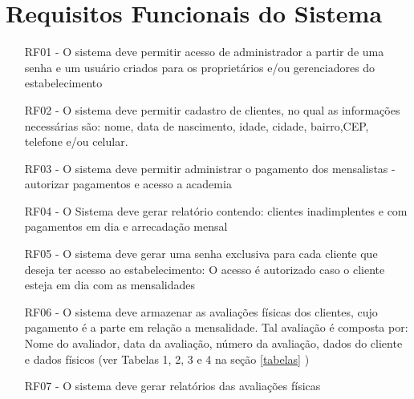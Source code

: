 





\section{Requisitos Funcionais do Sistema}

\begin{itemize}

\item[RF01 -]O sistema deve permitir acesso de administrador a partir de uma senha e um usuário criados para os proprietários e/ou gerenciadores do estabelecimento
\item[RF02 -] O sistema deve permitir cadastro de clientes, no qual as informações necessárias são: nome, data de nascimento, idade, cidade, bairro,CEP, telefone e/ou celular.
\item[RF03 -] O sistema deve permitir administrar o pagamento dos mensalistas - autorizar pagamentos e acesso a academia
\item[RF04 -] O Sistema deve gerar relatório contendo: clientes inadimplentes e com pagamentos em dia e arrecadação mensal
\item[RF05 -] O sistema deve gerar uma senha exclusiva para cada cliente que deseja ter acesso ao estabelecimento: O acesso é autorizado caso o cliente esteja em dia com as mensalidades
\item[RF06 -] O sistema deve armazenar as avaliações físicas dos clientes, cujo pagamento é a parte em relação a mensalidade. Tal avaliação é composta por: Nome do avaliador, data da avaliação, número da avaliação, dados do cliente e dados físicos (ver Tabelas 1, 2, 3 e 4 na seção \ref{tabelas} ) 
\item[RF07 - ] O sistema deve gerar relatórios das avaliações físicas


\end{itemize}


